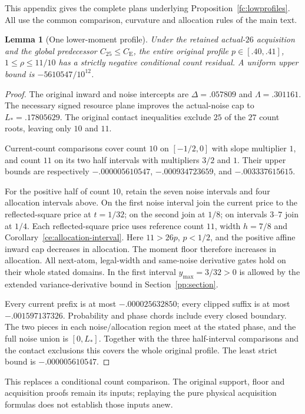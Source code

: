 \documentclass[aop,preprint]{imsart}
\newtheorem{lemma}[theorem]{Lemma}
\theoremstyle{definition}
\newcommand{\CE}{C_{\mathrm E}}
\numberwithin{equation}{section}
\begin{document}
This appendix gives the complete plans underlying Proposition~\ref{fc:lowprofiles}.
All use the common comparison, curvature and allocation rules of the main text.

\begin{lemma}[One lower-moment profile]\label{fc:low40}
Under the retained actual-$26$ acquisition and the global predecessor
$C_{25}\le\CE$, the entire original profile
$p\in[.40,.41]$, $1\le\rho\le11/10$ has a strictly negative
conditional count residual. A uniform upper bound is
$-5610547/10^{12}$.
\end{lemma}
\begin{proof}
The original inward and noise intercepts are
$\Delta=.057809$ and $\Lambda=.301161$.
The necessary signed resource plane improves the actual-noise cap
to $L_*=.17805629$. The original contact inequalities exclude
$25$ of the $27$ count roots, leaving only $10$ and $11$.

Current-count comparisons cover count $10$ on $[-1/2,0]$ with
slope multiplier $1$, and count $11$ on its two half intervals
with multipliers $3/2$ and $1$. Their upper bounds are respectively
$-.000005610547$, $-.000934723659$, and $-.003337615615$.

For the positive half of count $10$, retain the seven noise
intervals and four allocation intervals above.
On the first noise interval join the current price to the
reflected-square price at $t=1/32$; on the second join at
$1/8$; on intervals $3$--$7$ join at $1/4$.
Each reflected-square price uses reference count $11$, width
$h=7/8$ and Corollary~\ref{ce:allocation-interval}.
Here $11>26p$, $p<1/2$, and the positive affine inward cap
decreases in allocation. The moment floor therefore increases
in allocation. All next-atom, legal-width and same-noise derivative
gates hold on their whole stated domains. In the first interval
$y_{\max}=3/32>0$ is allowed by the extended variance-derivative
bound in Section~\ref{pp:section}.

Every current prefix is at most $-.000025632850$;
every clipped suffix is at most $-.001597137326$.
Probability and phase chords include every closed boundary.
The two pieces in each noise/allocation region meet at the stated
phase, and the full noise union is $[0,L_*]$.
Together with the three half-interval comparisons and the contact
exclusions this covers the whole original profile. The least strict
bound is $-.000005610547$.
\end{proof}

This replaces a conditional count comparison. The original support,
floor and acquisition proofs remain its inputs; replaying the pure
physical acquisition formulas does not establish those inputs anew.
\end{document}
